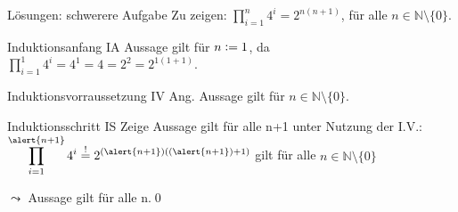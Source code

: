 {\begin{frame}[fragile]{Lösungen: schwerere Aufgabe}
     Zu zeigen: $\displaystyle\prod_{i=1}^{n} 4^i = 2^{n(n+1)}$, für alle $n \in \mathbb{N}\setminus \{0\}$.
    \begin{alertblock}{Induktionsanfang IA}
        Aussage gilt für $n\vcentcolon= 1$, da $\displaystyle\prod_{i=1}^{1} 4^i = 4^1 = 4 = 2^2 = 2^{1(1+1)}$.
    \end{alertblock}
    \begin{alertblock}{Induktionsvorraussetzung IV}
        Ang. Aussage gilt für $n \in\mathbb{N}\setminus \{0\}$.
    \end{alertblock}
    \begin{alertblock}{Induktionsschritt IS}
        Zeige Aussage gilt für alle n+1 unter Nutzung der I.V.:\\
        $\displaystyle\prod_{i=1}^{\alert{n+1}} 4^i \overset{!}{=} 2^{(\alert{n+1})((\alert{n+1})+1)}$ gilt für alle $n \in \mathbb{N}\setminus \{0\}$
    \end{alertblock}
    \alert{$\leadsto$ Aussage gilt für alle n.}\qed
\end{frame}
}

